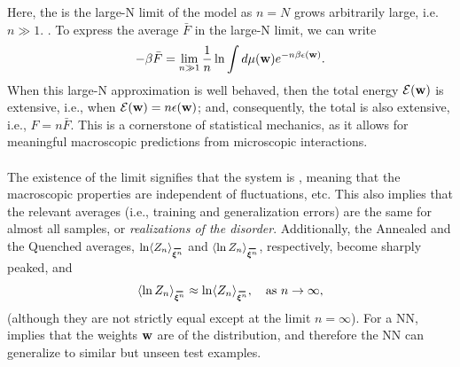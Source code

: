 Here, the \ThermodynamicLimit is the large-N limit of the model as $n=N$
grows arbitrarily large, i.e. $n \gg 1$.
.
To express the average \FreeEnergy $\bar{F}$ in the large-N limit, we can write
\begin{align}
  -\beta\bar{F} = \lim_{n\gg 1}\frac{1}{n}\ln \int d\mu({\mathbf{w}}) e^{-n\beta\epsilon({\mathbf{w}})}  .
\end{align}
When this large-N approximation is well behaved,
then the total energy $\mathcal{E}(\mathbf{w})$ is extensive, i.e., when $\mathcal{E}(\mathbf{w})=n\epsilon({\mathbf{w}})$;
and, consequently, the total \FreeEnergy is also extensive, i.e., $F=n\bar{F}$.
This is a cornerstone of statistical mechanics,
as it allows for meaningful macroscopic predictions from microscopic interactions.

\paragraph{\SelfAveraging}

The existence of the limit signifies that the system is \emph{\SelfAveraging}, meaning that
the macroscopic properties are independent of fluctuations, etc.
This also implies that the relevant averages
(i.e., training and generalization errors) are the same for almost all samples, or \emph{realizations of the disorder}.
Additionally, the Annealed and the Quenched averages,
$\ln \langle Z_n \rangle_{\AVGNDXIn}$ and $\langle \ln Z_n \rangle_{\AVGNDXIn}$, respectively,
become sharply peaked, and
\begin{align}
\langle \ln Z_n \rangle_{\AVGNDXIn} \approx \ln \langle Z_n \rangle_{\AVGNDXIn}, \quad \text{as } n \to \infty,
\end{align}
(although they are not strictly equal except at the limit $n = \infty$).
For a NN, \SelfAveraging implies that the weights ${\mathbf{w}}$ are \emph{\Typical} of the distribution,
and therefore the NN can generalize to similar but unseen test examples.

